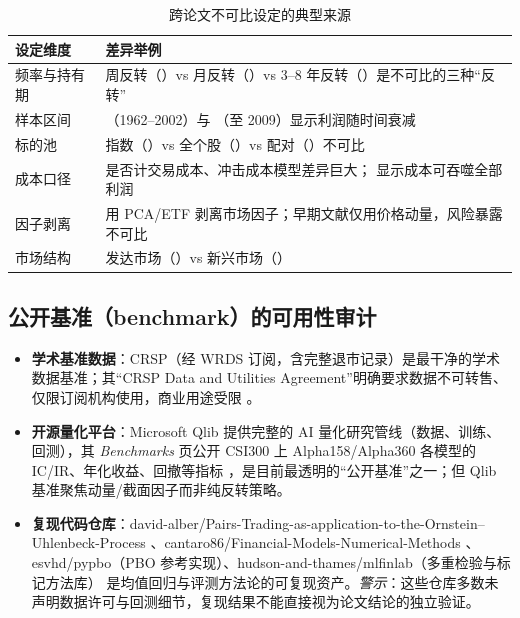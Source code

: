 \documentclass[11pt,a4paper]{ctexart}
\begin{document}
\begin{table}[htbp]
\centering
\caption{跨论文不可比设定的典型来源}
\label{tab:incomparable}
\begin{tabular}{@{}>{\raggedright\arraybackslash}p{3.8cm}>{\raggedright\arraybackslash}p{11.0cm}@{}}
\toprule
设定维度 & 差异举例 \\
\midrule
频率与持有期 & 周反转（\cite{lehmann1990}）vs 月反转（\cite{jegadeesh1990}）vs 3--8 年反转（\cite{poterbasummers1988}）是不可比的三种“反转” \\
样本区间 & \cite{gatev2006}（1962--2002）与 \cite{dofaff2012}（至 2009）显示利润随时间衰减 \\
标的池 & 指数（\cite{balvers2000}）vs 全个股（\cite{debondt1985}）vs 配对（\cite{gatev2006}）不可比 \\
成本口径 & 是否计交易成本、冲击成本模型差异巨大；\cite{martin2011} 显示成本可吞噬全部利润 \\
因子剥离 & \cite{avellaneda2010} 用 PCA/ETF 剥离市场因子；早期文献仅用价格动量，风险暴露不可比 \\
市场结构 & 发达市场（\cite{gatev2006,avellaneda2010}）vs 新兴市场（\cite{arxiv_tse,arxiv_crypto_coint,arxiv_poland_sa}） \\
\bottomrule
\end{tabular}
\end{table}

\subsection{公开基准（benchmark）的可用性审计}

\begin{itemize}
  \item \textbf{学术基准数据}：CRSP（经 WRDS 订阅，含完整退市记录）是最干净的学术数据基准；其“CRSP Data and Utilities Agreement”明确要求数据不可转售、仅限订阅机构使用，商业用途受限 \cite{crsp_wrds,crsp_license}。
  \item \textbf{开源量化平台}：Microsoft Qlib \cite{qlib} 提供完整的 AI 量化研究管线（数据、训练、回测），其 \emph{Benchmarks} 页公开 CSI300 上 Alpha158/Alpha360 各模型的 IC/IR、年化收益、回撤等指标 \cite{qlib_benchmarks}，是目前最透明的“公开基准”之一；但 Qlib 基准聚焦动量/截面因子而非纯反转策略。
  \item \textbf{复现代码仓库}：david-alber/Pairs-Trading-as-application-to-the-Ornstein--Uhlenbeck-Process \cite{repo_ou_pairs}、cantaro86/Financial-Models-Numerical-Methods \cite{repo_fmnm}、esvhd/pypbo（PBO 参考实现）\cite{repo_pypbo}、hudson-and-thames/mlfinlab（多重检验与标记方法库）\cite{repo_mlfinlab} 是均值回归与评测方法论的可复现资产。\emph{警示}：这些仓库多数未声明数据许可与回测细节，复现结果不能直接视为论文结论的独立验证。
\end{itemize}
\end{document}
